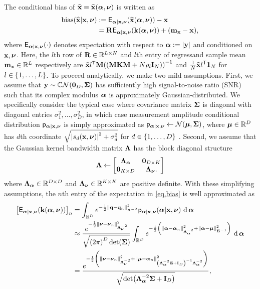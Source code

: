 The conditional bias 
of $\est{\bmx} \equiv \esta{\bmx}{\bmymag,\bmnu}$
is written as
\begin{align}
	\biasa{\est{\bmx}|\bmx,\bmnu} 
		&:= 
			\expect{\bmymag|\bmx,\bmnu}{\esta{\bmx}{\bmymag,\bmnu}} - \bmx
			\nonumber \\
		&= 
			\bmR \expect{\bmymag|\bmx,\bmnu}{\bmka{\bmymag,\bmnu}} 
			+ \paren{\bmmx-\bmx},
			\label{eq,bias}
\end{align}
where $\expect{\bmymag|\bmx,\bmnu}{\cdot}$ 
denotes expectation
with respect to $\bmymag := \abs{\bmy}$
and conditioned on $\mathbf{x},\boldsymbol{\nu}$.
Here,
the $l$th row of $\mathbf{R} \in \mathbb{R}^{L \times N}$ 
and $l$th entry of regressand sample mean 
$\mathbf{m}_{\mathbf{x}} \in \mathbb{R}^{L}$
respectively are $\bmxt{l}\tpose \bmM\inv{\paren{\bmM\bmK\bmM + N \rho_l \eye{N}}}$
and $\frac{1}{N}\tilde{\mathbf{x}}{l}^{\mathsf{T}}\boldsymbol{1}_{N}$
for $l \in \set{1,\dots,L}$.
To proceed analytically, 
we make two mild assumptions.
First, 
we assume 
that $\bmy \sim \cgauss{\zeros{D}}{\bmSig}$
has sufficiently high signal-to-noise ratio (SNR)
such that its complex modulus $\boldsymbol{\alpha}$ 
is approximately Gaussian-distributed.
We specifically consider the typical case
where covariance matrix $\boldsymbol{\Sigma}$ is diagonal
with diagonal entries $\sigma_1^2,\dots,\sigma_D^2$,
in which case measurement amplitude conditional distribution 
$\mathsf{p}_{\boldsymbol{\alpha}|\mathbf{x},\boldsymbol{\nu}}$
is simply approximated as
$\dist{\bmymag|\bmx,\bmnu} \gets \gauss{\bmmu}{\bmSig}$,
where $\boldsymbol{\mu} \in \mathbb{R}^{D}$ 
has $d$th coordinate $\sqrt{\abs{s_d\paren{\bmx,\bmnu}}^2 + \sigma_d^2}$ 
for $d \in \set{1,\dots,D}$ \cite{gudbjartsson:95:trd}.
Second,
we assume
that the Gaussian kernel bandwidth matrix $\boldsymbol{\Lambda}$ 
has the block diagonal structure
\begin{align}
	\boldsymbol{\Lambda} \gets 
		\begin{bmatrix}
			\boldsymbol{\Lambda}_{\boldsymbol{\alpha}} & \boldsymbol{0}_{D \times K} \\
			\boldsymbol{0}_{K \times D} & \boldsymbol{\Lambda}_{\boldsymbol{\nu}}.
		\end{bmatrix}
	\label{eq,sep-bw}
\end{align}
where $\boldsymbol{\Lambda}_{\boldsymbol{\alpha}} \in \mathbb{R}^{D \times D}$
and $\boldsymbol{\Lambda}_{\boldsymbol{\nu}} \in \mathbb{R}^{K \times K}$ 
are positive definite.
With these simplifying assumptions,
the $n$th entry 
of the expectation in \eqref{eq,bias}
is well approximated as
\begin{align}
	\brac{\expect{\bmymag|\bmx,\bmnu}{\bmka{\bmymag,\bmnu}}}_n
		&=
			\int_{\reals{D}} e^{%
				-\frac{1}{2} \norm{\bmq-\bmq_n}^2_{\bmL^{-2}}
			}%
			\dista{\bmymag|\bmx,\bmnu} \der{\bmymag}
			\nonumber \\
		&\approx	
			\frac{e^{-\frac{1}{2}\norm{\bmnu-\bmnu_n}^2_{\bmLnu^{-2}}}}
			{\sqrt{\paren{2\pi}^D \det\paren{\bmSig}}}
			\int_{\reals{D}} e^{%
				-\frac{1}{2} \paren{%
					\norm{\bmymag-\bmymag_n}^2_{\bmLy^{-2}} + 
					\norm{\bmymag-\bmmu}^2_{\bmSig^{-1}}
				}%
			}%
			\der{\bmymag}
			\nonumber \\
		&=
			\frac{%
				e^{%
					-\frac{1}{2}\paren{%
						\norm{\bmnu-\bmnu_n}^2_{\bmLnu^{-2}} +
						\norm{\bmmu-\bmymag_n}^2_{\paren{\bmLy^{-2}\bmSig + \eye{D}}^{-1}\bmLy^{-2}}
					}%
				}
			}{%
				\sqrt{\det\paren{\bmLy^{-2}\bmSig + \eye{D}}}
			},
			\label{eq,exp-bmk}
\end{align}
